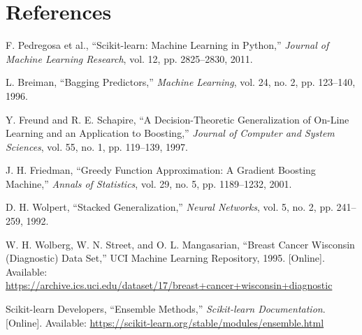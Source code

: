 \documentclass[11pt,a4paper]{article}
\begin{document}
\section{References}
\begin{enumerate}[label={[\arabic*]}]
\item F. Pedregosa et al., ``Scikit-learn: Machine Learning in Python,'' \emph{Journal of Machine Learning Research}, vol. 12, pp. 2825--2830, 2011.
\item L. Breiman, ``Bagging Predictors,'' \emph{Machine Learning}, vol. 24, no. 2, pp. 123--140, 1996.
\item Y. Freund and R. E. Schapire, ``A Decision-Theoretic Generalization of On-Line Learning and an Application to Boosting,'' \emph{Journal of Computer and System Sciences}, vol. 55, no. 1, pp. 119--139, 1997.
\item J. H. Friedman, ``Greedy Function Approximation: A Gradient Boosting Machine,'' \emph{Annals of Statistics}, vol. 29, no. 5, pp. 1189--1232, 2001.
\item D. H. Wolpert, ``Stacked Generalization,'' \emph{Neural Networks}, vol. 5, no. 2, pp. 241--259, 1992.
\item W. H. Wolberg, W. N. Street, and O. L. Mangasarian, ``Breast Cancer Wisconsin (Diagnostic) Data Set,'' UCI Machine Learning Repository, 1995. [Online]. Available: \url{https://archive.ics.uci.edu/dataset/17/breast+cancer+wisconsin+diagnostic}
\item Scikit-learn Developers, ``Ensemble Methods,'' \emph{Scikit-learn Documentation}. [Online]. Available: \url{https://scikit-learn.org/stable/modules/ensemble.html}
\end{enumerate}
\end{document}
